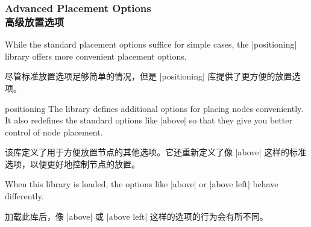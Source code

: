 \subsubsection{Advanced Placement Options\\高级放置选项}

While the standard placement options suffice for simple cases, the
|positioning| library offers more convenient placement options.

尽管标准放置选项足够简单的情况，但是 |positioning| 库提供了更方便的放置选项。

\begin{tikzlibrary}{positioning}
    The library defines additional options for placing nodes conveniently. It
    also redefines the standard options like |above| so that they give you
    better control of node placement.

    该库定义了用于方便放置节点的其他选项。它还重新定义了像 |above| 这样的标准选项，以便更好地控制节点的放置。
\end{tikzlibrary}

When this library is loaded, the options like |above| or |above left| behave
differently.

加载此库后，像 |above| 或 |above left| 这样的选项的行为会有所不同。

